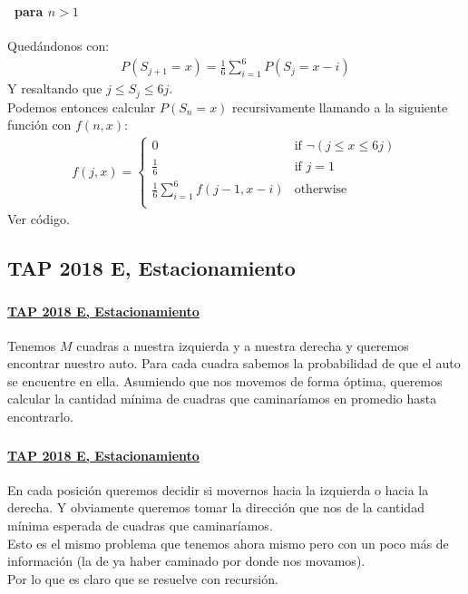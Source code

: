 \documentclass[../main.tex]{subfiles}
\begin{document}
\begin{frame}
  \frametitle{\SECTIONB}
  \framesubtitle{\EJA\ para \(n > 1\)}

  Quedándonos con:
  \begin{gather*}
    P(S_{j+1} = x) = \frac{1}{6}\sum_{i = 1}^{6}P(S_{j} = x - i)
  \end{gather*}
  Y resaltando que \(j \leq S_{j} \leq 6j\). \\
  Podemos entonces calcular \(P(S_{n} = x)\) recursivamente llamando a la siguiente función con \(f(n, x)\):
  \begin{gather*}
    f(j, x) = \begin{cases}
      0 & \text{if } \neg(j \leq x \leq 6j) \\
      \frac{1}{6} & \text{if } j = 1 \\
      \frac{1}{6}\sum_{i = 1}^{6}f(j-1, x-i) & \text{otherwise} \\
    \end{cases}
  \end{gather*} \pause
  Ver código.
\end{frame}

\newcommand{\EJB}{\href{https://codeforces.com/group/YjFmW2O15Q/contest/101919}{TAP 2018 E, Estacionamiento}}
\subsection{TAP 2018 E, Estacionamiento}

\begin{frame}
  \frametitle{\SECTIONB}
  \framesubtitle{\EJB}

  Tenemos \(M\) cuadras a nuestra izquierda y a nuestra derecha y queremos encontrar nuestro auto. Para cada cuadra sabemos la probabilidad de que el auto se encuentre en ella. Asumiendo que nos movemos de forma óptima, queremos calcular la cantidad mínima de cuadras que caminaríamos en promedio hasta encontrarlo.

\end{frame}

\begin{frame}
  \frametitle{\SECTIONB}
  \framesubtitle{\EJB}

  En cada posición queremos decidir si movernos hacia la izquierda o hacia la derecha. \pause Y obviamente queremos tomar la dirección que nos de la cantidad mínima esperada de cuadras que caminaríamos. \pause \\
  Esto es el mismo problema que tenemos ahora mismo pero con un poco más de información (la de ya haber caminado por donde nos movamos). \pause \\
  Por lo que es claro que se resuelve con recursión.
\end{frame}
\end{document}
